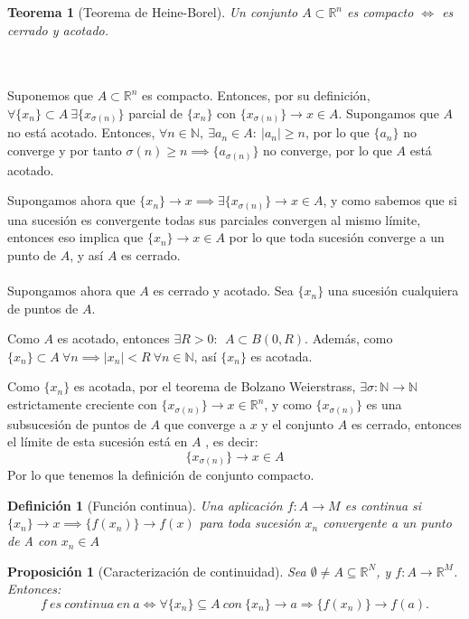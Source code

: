 \documentclass[11pt, a4paper]{article}
\makeatletter
\renewenvironment{proof}[1][\proofname] {\vspace{-15pt}\par\pushQED{\qed}\normalfont\topsep6\p@\@plus6\p@\relax\trivlist\item[\hskip\labelsep\it#1\@addpunct{.}]\ignorespaces}{\popQED\endtrivlist\@endpefalse}
\theoremstyle{theorem-style}
\newtheorem*{nth}{Teorema}
\newtheorem*{nprop}{Proposición}
\theoremstyle{definition-style}
\newtheorem*{ndef}{Definición}
\theoremstyle{remark-style}
\theoremstyle{example-style}
\makeatother
\begin{document}
\begin{nth}[Teorema de Heine-Borel]
	
	Un conjunto $A \subset \mathbb{R}^n$ es compacto $\iff$ es cerrado y acotado.
\end{nth}
\begin{proof}\hfill\\
	\boxed{\Rightarrow}\\
	Suponemos que $A \subset \mathbb{R}^n$ es compacto. Entonces, por su definición, $\forall \{x_n\} \subset A \ \exists \{x_{\sigma(n)}\}$ parcial de $\{x_n\}$ con $\{x_{\sigma(n)}\} \to x \in A$. Supongamos que $A$ no está acotado. Entonces, $\forall n \in \mathbb{N}, \ \exists a_n \in A : \ |a_n| \geq n$, por lo que $\{a_n\}$ no converge y por tanto $\sigma(n) \geq n \implies \{a_{\sigma(n)}\}$ no converge, por lo que $A$ está acotado.
	
	Supongamos ahora que $\{x_n\} \to x \implies \exists \{x_{\sigma(n)}\} \to x \in A$, y como sabemos que si una sucesión es convergente todas sus parciales convergen al mismo límite, entonces eso implica que $\{x_n\}\to x \in A$ por lo que toda sucesión converge a un punto de $A$, y así $A$ es cerrado.
	\\
	\boxed{\Leftarrow}\\
	Supongamos ahora que $A$ es cerrado y acotado. Sea $\{x_n\}$ una sucesión cualquiera de puntos de $A$.
	
	Como $A$ es acotado, entonces $\exists R > 0 : \ \ A \subset B(0,R)$. Además, como $\{x_n\} \subset A \ \forall n \implies |x_n| < R \ \forall n \in \mathbb{N}$, así $\{x_n\}$ es acotada.
	
	Como $\{x_n\}$ es acotada, por el teorema de Bolzano Weierstrass, $\exists \sigma: \mathbb{N} \to \mathbb{N}$ estrictamente creciente con $\{x_{\sigma(n)}\}\to x \in \mathbb{R}^n$, y como $\{x_{\sigma(n)}\}$ es una subsucesión de puntos de $A$ que converge a $x$ y el conjunto $A$ es cerrado, entonces el límite de esta sucesión está en $A$ , es decir:
	\[
	\{x_{\sigma(n)}\}\to x \in A
	\]
Por lo que tenemos la definición de conjunto compacto.

\end{proof}
\begin{ndef}[Función continua]
	Una aplicación $f:A \to M$ es continua si $\{x_n\} \to x \implies \{f(x_n)\} \to f(x)$ para toda sucesión $x_n$ convergente a un punto de A con $x_n\in A$
\end{ndef}

\begin{nprop}[Caracterización de continuidad]
Sea $\emptyset \ne A \subseteq \mathbb{R}^N$, y $f:A\longrightarrow \mathbb{R}^M$. Entonces: $$f\ es\ continua\ en\ a \iff \forall \{x_n\}\subseteq A\ con\ \{x_n\} \rightarrow a \Rightarrow \{f(x_n)\} \rightarrow f(a).$$
\end{nprop}
\end{document}

